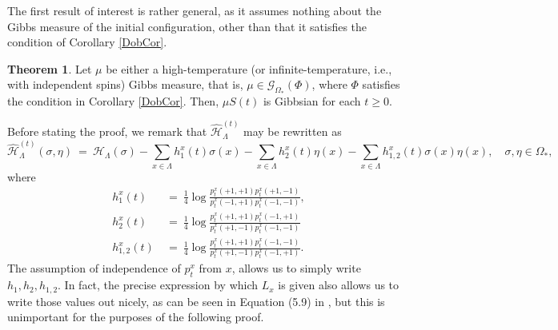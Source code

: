 \documentclass[12pt]{article}
\newcommand{\G}{\mathcal{G}}
\renewcommand{\H}{\mathcal{H}}
\newcommand{\1}{\mathbbm{1}}
\newcommand{\5}{\vspace{0.5cm}}
\renewcommand{\hat}{\widehat}
\theoremstyle{definition}
\newtheorem{thm}{Theorem}[section]
\begin{document}
The first result of interest is rather general, as it assumes nothing about the Gibbs measure of the initial configuration, other than that it satisfies the condition of Corollary \ref{DobCor}.

\begin{thm}\label{HighTempTHM}
Let $\mu$ be either a high-temperature (or infinite-temperature, i.e., with independent spins) Gibbs measure, that is, $\mu\in\G_{\Omega_*}(\Phi)$, where $\Phi$ satisfies the condition in Corollary \ref{DobCor}. Then, $\mu S(t)$ is Gibbsian for each $t\geq 0$.
\end{thm}

Before stating the proof, we remark that $\hat{\H}_\Lambda^{(t)}$ may be rewritten as
$$\hat{\H}_\Lambda^{(t)}(\sigma,\eta) ~=~ \H_\Lambda(\sigma) - \sum_{x\in\Lambda}h_1^x(t)\sigma(x) - \sum_{x\in\Lambda}h_2^x(t)\eta(x) - \sum_{x\in\Lambda}h_{1,2}^x(t)\sigma(x)\eta(x), \quad \sigma,\eta\in\Omega_*,$$
where 
\begin{align*}
h_1^x(t) ~&=~ \frac{1}{4}\log\frac{p_t^x(+1,+1)p_t^x(+1,-1)}{p_t^x(-1,+1)p_t^x(-1,-1)}, \\
h_2^x(t) ~&=~ \frac{1}{4}\log\frac{p_t^x(+1,+1)p_t^x(-1,+1)}{p_t^x(+1,-1)p_t^x(-1,-1)} \\
h_{1,2}^x(t) ~&=~ \frac{1}{4}\log\frac{p_t^{x}(+1,+1)p_t^x(-1,-1)}{p_t^x{(+1,-1)}p_t^{x}(-1,+1)}.
\end{align*}
The assumption of independence of $p_t^x$ from $x$, allows us to simply write $h_1,h_2,h_{1,2}$. In fact, the precise expression by which $L_x$ is given also allows us to write those values out nicely, as can be seen in Equation (5.9) in \cite{EFHR}, but this is unimportant for the purposes of the following proof.
\end{document}
